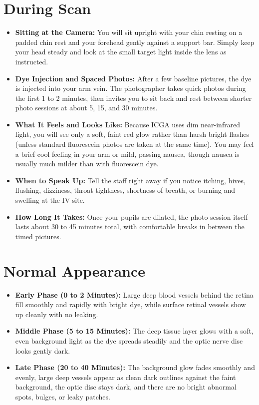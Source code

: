 \section{During Scan}

\begin{itemize}
    \item \textbf{Sitting at the Camera:} You will sit upright with your chin resting on a padded chin rest and your forehead gently against a support bar. Simply keep your head steady and look at the small target light inside the lens as instructed.
    \item \textbf{Dye Injection and Spaced Photos:} After a few baseline pictures, the dye is injected into your arm vein. The photographer takes quick photos during the first 1 to 2 minutes, then invites you to sit back and rest between shorter photo sessions at about 5, 15, and 30 minutes.
    \item \textbf{What It Feels and Looks Like:} Because ICGA uses dim near-infrared light, you will see only a soft, faint red glow rather than harsh bright flashes (unless standard fluorescein photos are taken at the same time). You may feel a brief cool feeling in your arm or mild, passing nausea, though nausea is usually much milder than with fluorescein dye.
    \item \textbf{When to Speak Up:} Tell the staff right away if you notice itching, hives, flushing, dizziness, throat tightness, shortness of breath, or burning and swelling at the IV site.
    \item \textbf{How Long It Takes:} Once your pupils are dilated, the photo session itself lasts about 30 to 45 minutes total, with comfortable breaks in between the timed pictures.
\end{itemize}

\section{Normal Appearance}

\begin{itemize}
    \item \textbf{Early Phase (0 to 2 Minutes):} Large deep blood vessels behind the retina fill smoothly and rapidly with bright dye, while surface retinal vessels show up cleanly with no leaking.
    \item \textbf{Middle Phase (5 to 15 Minutes):} The deep tissue layer glows with a soft, even background light as the dye spreads steadily and the optic nerve disc looks gently dark.
    \item \textbf{Late Phase (20 to 40 Minutes):} The background glow fades smoothly and evenly, large deep vessels appear as clean dark outlines against the faint background, the optic disc stays dark, and there are no bright abnormal spots, bulges, or leaky patches.
\end{itemize}

